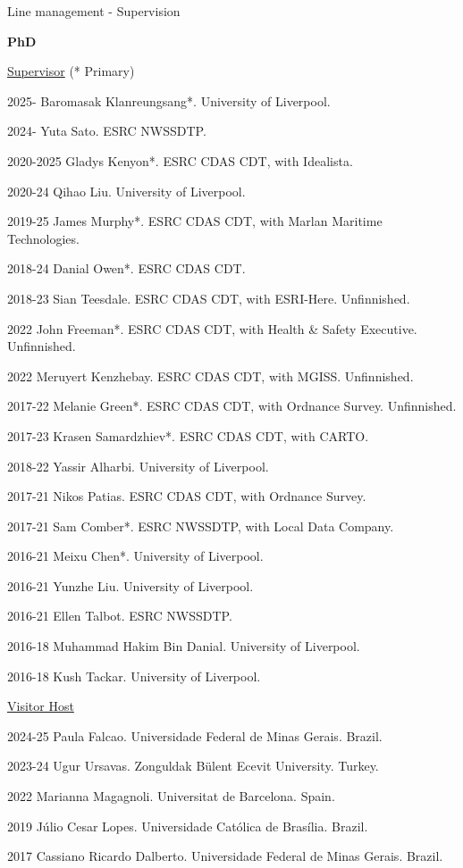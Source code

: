 \documentclass[12pt,2up]{article}
\begin{document}
\begin{cv}{}
\begin{cvlist}{Line management - Supervision}
\item[\textbf{PhD}]
\item{\underline{Supervisor} (\** Primary)}
\item[2025-] Baromasak Klanreungsang\**. University of Liverpool.
\item[2024-] Yuta Sato. ESRC NWSSDTP.
\item[2020-2025] Gladys Kenyon\**. ESRC CDAS CDT, with Idealista.
\item[2020-24] Qihao Liu. University of Liverpool.
\item[2019-25] James Murphy\**. ESRC CDAS CDT, with Marlan Maritime Technologies.
\item[2018-24] Danial Owen\**. ESRC CDAS CDT.
\item[2018-23] Sian Teesdale. ESRC CDAS CDT, with ESRI-Here. Unfinnished.
\item[2022] John Freeman\**. ESRC CDAS CDT, with Health \& Safety Executive. Unfinnished.
\item[2022] Meruyert Kenzhebay. ESRC CDAS CDT, with MGISS. Unfinnished.
\item[2017-22] Melanie Green\**. ESRC CDAS CDT, with Ordnance Survey.
        Unfinnished.
\item[2017-23] Krasen Samardzhiev\**. ESRC CDAS CDT, with CARTO.
\item[2018-22] Yassir Alharbi. University of Liverpool.
\item[2017-21] Nikos Patias. ESRC CDAS CDT, with Ordnance Survey.
\item[2017-21] Sam Comber\**. ESRC NWSSDTP, with Local Data Company.
\item[2016-21] Meixu Chen\**. University of Liverpool.
\item[2016-21] Yunzhe Liu. University of Liverpool.
\item[2016-21] Ellen Talbot. ESRC NWSSDTP.
\item[2016-18] Muhammad Hakim Bin Danial. University of Liverpool.
\item[2016-18] Kush Tackar. University of Liverpool.


\item{\underline{Visitor Host}}

\item[2024-25] Paula Falcao. Universidade Federal de Minas Gerais. Brazil.
\item[2023-24] Ugur Ursavas. Zonguldak B\"ulent Ecevit University. Turkey.
\item[2022] Marianna Magagnoli. Universitat de Barcelona. Spain.
\item[2019] J\'{u}lio Cesar Lopes. Universidade Cat\'olica de Bras\'ilia.
    Brazil.
\item[2017] Cassiano Ricardo Dalberto. Universidade Federal de Minas Gerais.
    Brazil.



\end{cvlist}
\end{cv}
\end{document}
